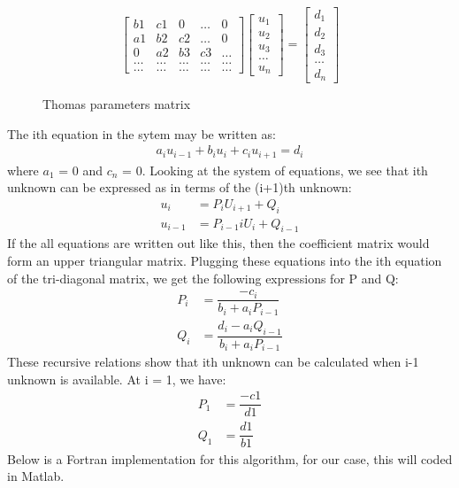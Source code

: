 \documentclass[12pt]{article}
\begin{document}
	
	\begin{figure}[H]
		
		\[	
		\begin{bmatrix}
		b1 & c1 & 0 & \dots & 0 \\
		a1 & b2 & c2 & \dots & 0 \\
		0 & a2 & b3 & c3 & \dots \\
		\dots  & \dots  & \dots  & \dots & \dots  \\
		\dots & \dots & \dots & \dots & \dots 
		\end{bmatrix}
		\begin{bmatrix}
		u_1 \\ u_2 \\ u_3 \\ \dots \\ u_n 
		\end{bmatrix}
		=
		\begin{bmatrix}
		d_1 \\ d_2 \\ d_3 \\ \dots \\ d_n 
		\end{bmatrix}
		\]
		\caption{Thomas parameters matrix}
	\end{figure}
	\noindent
	The ith equation in the sytem may be written as:	
	\begin{align*}
		a_iu_{i-1} + b_iu_i+ c_iu_{i+1} = d_i
	\end{align*}
	where $a_1$ = 0 and $c_n$ = 0. Looking at the system of equations, we see that ith unknown can be expressed as in terms of the (i+1)th unknown: 	
	\begin{align*}
		u_i &= P_iU_{i+1}+Q_i\\
		u_{i-1}&=P_{i-1}iU_i+Q_{i-1}
	\end{align*}  
	If the all equations are written out like this, then the coefficient matrix would form an upper triangular matrix. Plugging these equations into the ith equation of the tri-diagonal matrix, we get the following expressions for P and Q: 
	\begin{align*}
		P_i &= \dfrac{-c_i}{b_i+a_iP_{i-1}}\\
		Q_i &= \dfrac{d_i-a_iQ_{i-1}}{b_i+a_iP_{i-1}}
	\end{align*} 
	These recursive relations show that ith unknown can be calculated when i-1 unknown is available. At i = 1, we have: 
	\begin{align*}
		P_1 &= \dfrac{-c1}{d1}\\
		Q_1 &= \dfrac{d1}{b1}
	\end{align*}
	Below is a Fortran implementation for this algorithm, for our case, this will coded in Matlab. 
	
\end{document}

